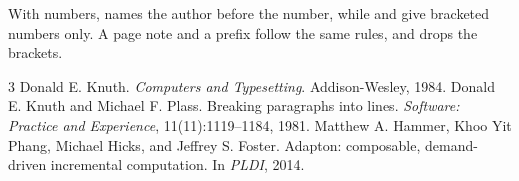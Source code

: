 \documentclass{article}
\begin{document}
With numbers, \citet{knuth84} names the author before the number, while
\citep{plass81} and \cite{knuth84,plass81} give bracketed numbers only. A
page note \citep[p.~7]{knuth84} and a prefix \citep[see][]{plass81} follow
the same rules, and \citealp{hammer14} drops the brackets.

\begin{thebibliography}{3}
 Donald E. Knuth. \emph{Computers and Typesetting}. Addison-Wesley, 1984.
 Donald E. Knuth and Michael F. Plass.
  Breaking paragraphs into lines. \emph{Software: Practice and Experience},
  11(11):1119--1184, 1981.
  Matthew A. Hammer, Khoo Yit Phang, Michael Hicks, and Jeffrey S. Foster.
  Adapton: composable, demand-driven incremental computation. In \emph{PLDI},
  2014.
\end{thebibliography}
\end{document}
